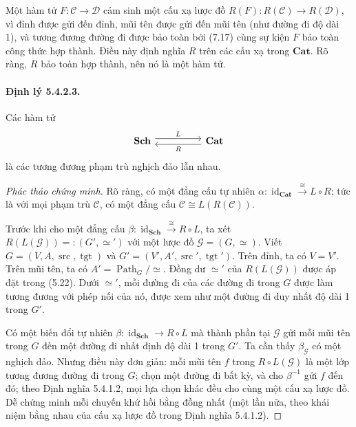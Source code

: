 Một hàm tử $F:\mathcal C\to\mathcal D$ cảm sinh một cấu xạ lược đồ $R(F):R(\mathcal C)\to R(\mathcal D)$, vì đỉnh được gửi đến đỉnh, mũi tên được gửi đến mũi tên (như đường đi độ dài 1), và tương đương đường đi được bảo toàn bởi (7.17) cùng sự kiện $F$ bảo toàn công thức hợp thành. Điều này định nghĩa $R$ trên các cấu xạ trong $\mathbf{Cat}$. Rõ ràng, $R$ bảo toàn hợp thành, nên nó là một hàm tử.
\paragraph{Định lý 5.4.2.3.} Các hàm tử
\[\begin{tikzcd}[column sep=huge]\mathbf{Sch}\arrow[r,shift left=3pt,"L"]&\mathbf{Cat}\arrow[l,shift left=3pt,"R"]\end{tikzcd}\]
là các tương đương phạm trù nghịch đảo lẫn nhau.
\begin{proof}[Phác thảo chứng minh]Rõ ràng, có một đẳng cấu tự nhiên $\alpha:\operatorname{id}_{\mathbf{Cat}}\xrightarrow{\cong}L\circ R$; tức là với mọi phạm trù $\mathcal C$, có một đẳng cấu $\mathcal C\cong L(R(\mathcal C))$.

Trước khi cho một đẳng cấu $\beta:\operatorname{id}_{\mathbf{Sch}}\xrightarrow{\cong}R\circ L$, ta xét $R(L(\mathcal G))=:(G',\simeq')$ với một lược đồ $\mathcal G=(G,\simeq)$. Viết $G=(V,A,\operatorname{src},\operatorname{tgt})$ và $G'=(V',A',\operatorname{src}',\operatorname{tgt}')$. Trên đỉnh, ta có $V=V'$. Trên mũi tên, ta có $A'=\operatorname{Path}_G/\simeq$. Đồng dư $\simeq'$ của $R(L(\mathcal G))$ được áp đặt trong (5.22). Dưới $\simeq'$, mỗi đường đi của các đường đi trong $G$ được làm tương đương với phép nối của nó, được xem như một đường đi duy nhất độ dài 1 trong $G'$.

Có một biến đổi tự nhiên $\beta:\operatorname{id}_{\mathbf{Sch}}\to R\circ L$ mà thành phần tại $\mathcal G$ gửi mỗi mũi tên trong $G$ đến một đường đi nhất định độ dài 1 trong $G'$. Ta cần thấy $\beta_{\mathcal G}$ có một nghịch đảo. Nhưng điều này đơn giản: mỗi mũi tên $f$ trong $R\circ L(\mathcal G)$ là một lớp tương đương đường đi trong $G$; chọn một đường đi bất kỳ, và cho $\beta^{-1}$ gửi $f$ đến đó; theo Định nghĩa 5.4.1.2, mọi lựa chọn khác đều cho cùng một cấu xạ lược đồ. Dễ chứng minh mỗi chuyến khứ hồi bằng đồng nhất (một lần nữa, theo khái niệm bằng nhau của cấu xạ lược đồ trong Định nghĩa 5.4.1.2).\end{proof}
